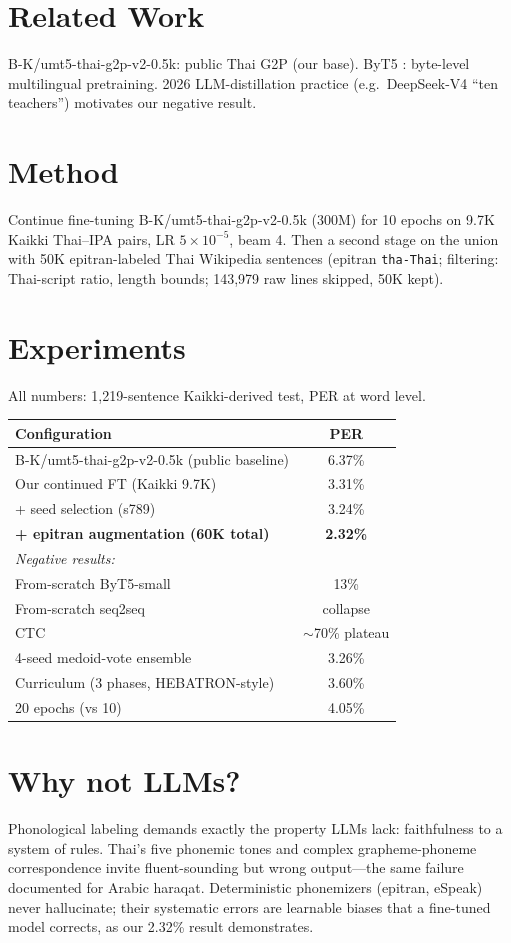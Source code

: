 \documentclass[11pt]{article}
\begin{document}
\section{Related Work}
B-K/umt5-thai-g2p-v2-0.5k: public Thai G2P (our base). ByT5
\cite{byt5}: byte-level multilingual pretraining. 2026 LLM-distillation
practice (e.g.\ DeepSeek-V4 ``ten teachers'') motivates our negative
result.

\section{Method}
Continue fine-tuning B-K/umt5-thai-g2p-v2-0.5k (300M) for 10 epochs on
9.7K Kaikki Thai--IPA pairs, LR $5{\times}10^{-5}$, beam 4. Then a
second stage on the union with 50K epitran-labeled Thai Wikipedia
sentences (epitran \texttt{tha-Thai}; filtering: Thai-script ratio,
length bounds; 143,979 raw lines skipped, 50K kept).

\section{Experiments}
All numbers: 1,219-sentence Kaikki-derived test, PER at word level.

\begin{table}[h]
\centering
\begin{tabular}{lc}
\toprule
Configuration & PER \\
\midrule
B-K/umt5-thai-g2p-v2-0.5k (public baseline) & 6.37\% \\
Our continued FT (Kaikki 9.7K) & 3.31\% \\
+ seed selection (s789) & 3.24\% \\
\textbf{+ epitran augmentation (60K total)} & \textbf{2.32\%} \\
\midrule
\multicolumn{2}{l}{\emph{Negative results:}} \\
From-scratch ByT5-small & 13\% \\
From-scratch seq2seq & collapse \\
CTC & $\sim$70\% plateau \\
4-seed medoid-vote ensemble & 3.26\% \\
Curriculum (3 phases, HEBATRON-style) & 3.60\% \\
20 epochs (vs 10) & 4.05\% \\
\bottomrule
\end{tabular}
\end{table}

\section{Why not LLMs?}
Phonological labeling demands exactly the property LLMs lack:
faithfulness to a system of rules. Thai's five phonemic tones and
complex grapheme-phoneme correspondence invite fluent-sounding but wrong
output---the same failure documented for Arabic haraqat. Deterministic
phonemizers (epitran, eSpeak) never hallucinate; their systematic errors
are learnable biases that a fine-tuned model corrects, as our 2.32\%
result demonstrates.
\end{document}
